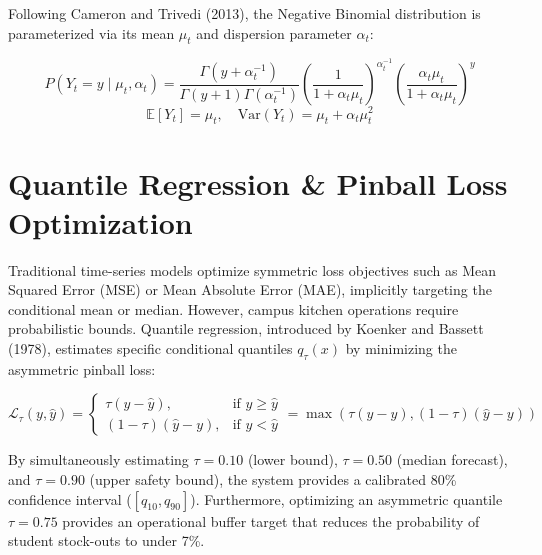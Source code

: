 \documentclass[11pt,a4paper,oneside]{report}
\begin{document}
Following Cameron and Trivedi (2013), the Negative Binomial distribution is parameterized via its mean $\mu_t$ and dispersion parameter $\alpha_t$:
\begin{mathformulationbox}
$$P(Y_t = y \mid \mu_t, \alpha_t) = \frac{\Gamma(y + \alpha_t^{-1})}{\Gamma(y + 1)\Gamma(\alpha_t^{-1})} \left(\frac{1}{1 + \alpha_t \mu_t}\right)^{\alpha_t^{-1}} \left(\frac{\alpha_t \mu_t}{1 + \alpha_t \mu_t}\right)^y$$
$$\mathbb{E}[Y_t] = \mu_t, \quad \text{Var}(Y_t) = \mu_t + \alpha_t \mu_t^2$$
\end{mathformulationbox}

\section{Quantile Regression \& Pinball Loss Optimization}
Traditional time-series models optimize symmetric loss objectives such as Mean Squared Error (MSE) or Mean Absolute Error (MAE), implicitly targeting the conditional mean or median. However, campus kitchen operations require probabilistic bounds. Quantile regression, introduced by Koenker and Bassett (1978), estimates specific conditional quantiles $q_\tau(x)$ by minimizing the asymmetric pinball loss:
\begin{mathformulationbox}
$$\mathcal{L}_\tau(y, \hat{y}) = \begin{cases} 
\tau (y - \hat{y}), & \text{if } y \ge \hat{y} \\
(1 - \tau) (\hat{y} - y), & \text{if } y < \hat{y} 
\end{cases} = \max\left(\tau(y - \hat{y}), (1 - \tau)(\hat{y} - y)\right)$$
\end{mathformulationbox}
By simultaneously estimating $\tau = 0.10$ (lower bound), $\tau = 0.50$ (median forecast), and $\tau = 0.90$ (upper safety bound), the system provides a calibrated 80\% confidence interval ($[q_{10}, q_{90}]$). Furthermore, optimizing an asymmetric quantile $\tau = 0.75$ provides an operational buffer target that reduces the probability of student stock-outs to under 7\%.
\end{document}
